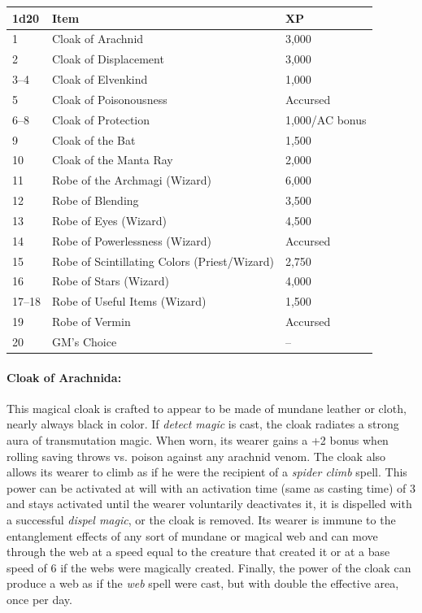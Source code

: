 \begin{multicols}{2}
\noindent
\begin{minipage}{\columnwidth}

\label{cloaksrobes}
\noindent
\begin{tabular}{|p{}|p{}|p{}|}
\hline
1d20	& Item	& XP \\
\hline\hline
\rowcolor[gray]{.9}1	& Cloak of Arachnid	& 3,000 \\
2	& Cloak of Displacement	& 3,000 \\
\rowcolor[gray]{.9}3--4	& Cloak of Elvenkind	& 1,000 \\
5	& Cloak of Poisonousness	& Accursed \\
\rowcolor[gray]{.9}6--8	& Cloak of Protection	& 1,000/AC bonus \\
9	& Cloak of the Bat	& 1,500 \\
\rowcolor[gray]{.9}10	& Cloak of the Manta Ray	& 2,000 \\
11	& Robe of the Archmagi (Wizard)	& 6,000 \\
\rowcolor[gray]{.9}12	& Robe of Blending	& 3,500 \\
13	& Robe of Eyes (Wizard)	& 4,500 \\
\rowcolor[gray]{.9}14	& Robe of Powerlessness (Wizard)	& Accursed \\
15	& Robe of Scintillating Colors (Priest/Wizard)	& 2,750 \\
\rowcolor[gray]{.9}16	& Robe of Stars (Wizard)	& 4,000 \\
17--18	& Robe of Useful Items (Wizard)	& 1,500 \\
\rowcolor[gray]{.9}19	& Robe of Vermin	& Accursed \\
20	& GM's Choice	& -- \\
\hline
\end{tabular}

\end{minipage}

\paragraph{Cloak of Arachnida:} This magical cloak is crafted to appear to be made of mundane leather or cloth, nearly always black in color.  If \textit{detect magic} is cast, the cloak radiates a strong aura of transmutation magic.  When worn, its wearer gains a +2 bonus when rolling saving throws vs. poison against any arachnid venom.  The cloak also allows its wearer to climb as if he were the recipient of a \textit{spider climb} spell.  This power can be activated at will with an activation time (same as casting time) of 3 and stays activated until the wearer voluntarily deactivates it, it is dispelled with a successful \textit{dispel magic}, or the cloak is removed.  Its wearer is immune to the entanglement effects of any sort of mundane or magical web and can move through the web at a speed equal to the creature that created it or at a base speed of 6 if the webs were magically created.  Finally, the power of the cloak can produce a web as if the \textit{web} spell were cast, but with double the effective area, once per day.


\end{multicols}
